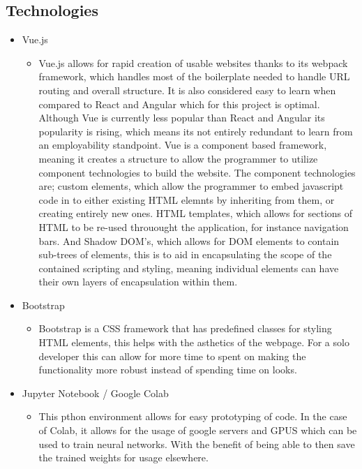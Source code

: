 \subsection{Technologies}
  \begin{itemize}
    \item Vue.js
    \begin{itemize}
      \item Vue.js allows for rapid creation of usable websites thanks to its webpack framework, which handles most of the boilerplate needed to handle URL routing and overall structure. It is also considered easy to learn when compared to React and Angular \cite{StudiengangBachelor} which for this project is optimal. Although Vue is currently less popular than React and Angular its popularity is rising, which means its not entirely redundant to learn from an employability standpoint. Vue is a component based framework, meaning it creates a structure to allow the programmer to utilize component technologies to build the website. The component technologies are; custom elements, which allow the programmer to embed javascript code in to either existing HTML elemnts by inheriting from them, or creating entirely new ones. HTML templates, which allows for sections of HTML to be re-used throuought the application, for instance navigation bars. And Shadow DOM's, which allows for DOM elements to contain sub-trees of elements, this is to aid in encapsulating the scope of the contained scripting and styling, meaning individual elements can have their own layers of encapsulation within them.
    \end{itemize}
    \item Bootstrap
        \begin{itemize}
          \item Bootstrap is a CSS framework that has predefined classes for styling HTML elements, this helps with the asthetics of the webpage. For a solo developer this can allow for more time to spent on making the functionality more robust instead of spending time on looks.
        \end{itemize}
    \item Jupyter Notebook / Google Colab
      \begin{itemize}
        \item This pthon environment allows for easy prototyping of code. In the case of Colab, it allows for the usage of google servers and GPUS which can be used to train neural networks. With the benefit of being able to then save the trained weights for usage elsewhere.

\end{itemize}
\end{itemize}

